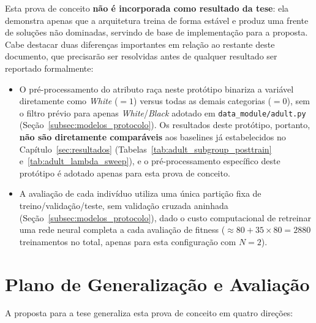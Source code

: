 Esta prova de conceito \textbf{não é incorporada como resultado da tese}: ela demonstra apenas que a arquitetura treina de forma estável e produz uma frente de soluções não dominadas, servindo de base de implementação para a proposta. Cabe destacar duas diferenças importantes em relação ao restante deste documento, que precisarão ser resolvidas antes de qualquer resultado ser reportado formalmente:

\begin{itemize}
    \item O pré-processamento do atributo raça neste protótipo binariza a variável diretamente como \textit{White} ($=1$) versus todas as demais categorias ($=0$), sem o filtro prévio para apenas \textit{White}/\textit{Black} adotado em \texttt{data\_module/adult.py} (Seção~\ref{subsec:modelos_protocolo}). Os resultados deste protótipo, portanto, \textbf{não são diretamente comparáveis} aos baselines já estabelecidos no Capítulo~\ref{sec:resultados} (Tabelas~\ref{tab:adult_subgroup_posttrain} e~\ref{tab:adult_lambda_sweep}), e o pré-processamento específico deste protótipo é adotado apenas para esta prova de conceito.
    \item A avaliação de cada indivíduo utiliza uma única partição fixa de treino/validação/teste, sem validação cruzada aninhada (Seção~\ref{subsec:modelos_protocolo}), dado o custo computacional de retreinar uma rede neural completa a cada avaliação de fitness ($\approx 80 + 35 \times 80 = 2880$ treinamentos no total, apenas para esta configuração com $N=2$).
\end{itemize}

\section{Plano de Generalização e Avaliação}\label{sec:generalizacao_avaliacao}

A proposta para a tese generaliza esta prova de conceito em quatro direções:

